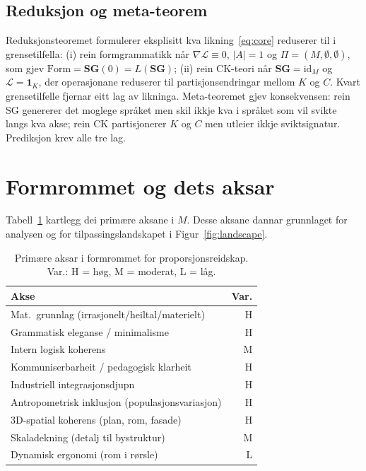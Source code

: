 \documentclass[10pt,twocolumn]{article}
\begin{document}
\subsection{Reduksjon og meta-teorem}
Reduksjonsteoremet \citep[prop.~5.72]{Finne2026} formulerer eksplisitt kva likning~\eqref{eq:core} reduserer til i grensetilfella: (i) rein formgrammatikk n\aa r $\nabla \mathcal{L} \equiv 0$, $|A| = 1$ og $\Pi = (M, \emptyset, \emptyset)$, som gjev $\mathrm{Form} = \mathbf{SG}(0) = L(\mathbf{SG})$; (ii) rein CK-teori n\aa r $\mathbf{SG} = \mathrm{id}_M$ og $\mathcal{L} = \mathbf{1}_K$, der operasjonane reduserer til partisjonsendringar mellom $K$ og $C$. Kvart grensetilfelle fjernar eitt lag av likninga. Meta-teoremet \citep[prop.~7.15]{Finne2026} gjev konsekvensen: rein SG genererer det moglege spr\aa ket men skil ikkje kva i spr\aa ket som vil svikte langs kva akse; rein CK partisjonerer $K$ og $C$ men utleier ikkje sviktsignatur. Prediksjon krev alle tre lag.

\section{Formrommet og dets aksar}

Tabell~\ref{tab:axes} kartlegg dei prim\ae re aksane i $M$. Desse aksane dannar grunnlaget for analysen og for tilpassingslandskapet i Figur~\ref{fig:landscape}.

\begin{table}[t]
\centering
\caption{Prim\ae re aksar i formrommet for proporsjonsreidskap. Var.: H = h\o{}g, M = moderat, L = l\aa g.}
\label{tab:axes}
\small
\begin{tabular}{@{}lr@{}}
\toprule
\textbf{Akse} & \textbf{Var.} \\
\midrule
Mat.\ grunnlag (irrasjonelt/heiltal/materielt) & H \\
Grammatisk eleganse / minimalisme & H \\
Intern logisk koherens & M \\
Kommuniserbarheit / pedagogisk klarheit & H \\
Industriell integrasjonsdjupn & H \\
Antropometrisk inklusjon (populasjonsvariasjon) & H \\
3D-spatial koherens (plan, rom, fasade) & H \\
Skaladekning (detalj til bystruktur) & M \\
Dynamisk ergonomi (rom i r\o{}rsle) & L \\
\bottomrule
\end{tabular}
\end{table}
\end{document}
